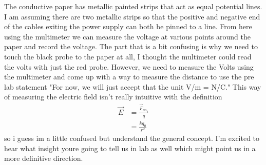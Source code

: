 \documentclass{article}
\begin{document}
    The conductive paper has metallic painted strips that act as equal potential lines. I am assuming there are two metallic strips so that the positive and negative end of the cables exiting the power supply can both be pinned to a line. From here using the multimeter we can measure the voltage at various points around the paper and record the voltage. The part that is a bit confusing is why we need to touch the black probe to the paper at all, I thought the multimeter could read the volts with just the red probe. However, we need to measure the Volts using the multimeter and come up with a way to measure the distance to use the pre lab statement "For now, we will just accept that the unit V/m = N/C." This way of measuring the electric field isn't really intuitive with the definition
    \begin{align*}
        \vec{E} &= \frac{\vec{F}_{on}_q}{q}\\
        &= \frac{kq_0}{r^2}
    \end{align*}
    so i guess im a little confused but understand the general concept. I'm excited to hear what insight youre going to tell us in lab as well which might point us in a more definitive direction. 
\end{document}
